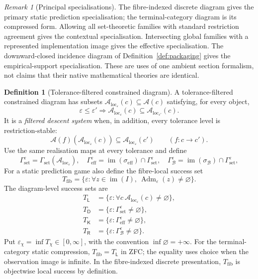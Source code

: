 \documentclass[11pt]{article}
\theoremstyle{plain}
\theoremstyle{definition}
\newtheorem{definition}[theorem]{Definition}
\theoremstyle{remark}
\newtheorem{remark}[theorem]{Remark}
\newcommand{\im}{\operatorname{im}}
\newcommand{\Adm}{\operatorname{Adm}}
\newcommand{\LocalAdm}{\mathcal{A}_{\mathrm{loc}}}
\newcommand{\eps}{\varepsilon}
\begin{document}
\begin{remark}[Principal specialisations]
The fibre-indexed discrete diagram gives the primary static prediction
specialisation; the terminal-category diagram is its compressed form. Allowing all
set-theoretic families with standard restriction agreement gives the contextual
specialisation. Intersecting global families with a represented implementation
image gives the effective specialisation. The downward-closed incidence diagram
of Definition~\ref{def:packaging} gives the empirical-support specialisation.
These are uses of one ambient section formalism, not claims that their native
mathematical theories are identical.
\end{remark}

\begin{definition}[Tolerance-filtered constrained diagram]\label{def:epsEC}
A tolerance-filtered constrained diagram has subsets
$\LocalAdm_\eps(c)\subseteq\mathcal A(c)$ satisfying, for every object,
\[
\eps\le\eps'
\Longrightarrow
\LocalAdm_\eps(c)\subseteq\LocalAdm_{\eps'}(c).
\]
It is a \emph{filtered descent system} when, in addition, every tolerance level
is restriction-stable:
\[
\mathcal A(f)(\LocalAdm_\eps(c))
\subseteq\LocalAdm_\eps(c')
\qquad(f:c\to c').
\]
Use the same realisation maps at every tolerance and define
\[
\Gamma_{\mathrm{set}}^\eps
=\Gamma_{\mathrm{set}}(\LocalAdm_\eps),\quad
\Gamma_{\mathrm{eff}}^\eps
=\im(\sigma_{\mathrm{eff}})\cap\Gamma_{\mathrm{set}}^\eps,
\quad
\Gamma_{\mathcal B}^\eps
=\im(\sigma_{\mathcal B})\cap\Gamma_{\mathrm{set}}^\eps,
\]
For a static prediction game also define the fibre-local success set
\[
T_{\mathrm{fib}}
=\{\eps:\forall z\in\im(I),\ \Adm_\eps(z)\ne\varnothing\}.
\]
The diagram-level success sets are
\begin{align*}
T_{\mathsf L}&=\{\eps:\forall c\ \LocalAdm_\eps(c)\ne\varnothing\},\\
T_{\mathsf D}&=\{\eps:\Gamma_{\mathrm{set}}^\eps\ne\varnothing\},\\
T_{\mathsf K}&=\{\eps:\Gamma_{\mathrm{eff}}^\eps\ne\varnothing\},\\
T_{\mathsf R}&=\{\eps:\Gamma_{\mathcal B}^\eps\ne\varnothing\}.
\end{align*}
Put $\eps_\chi=\inf T_\chi\in[0,\infty]$, with the convention
$\inf\varnothing=+\infty$.
For the terminal-category static compression, $T_{\mathrm{fib}}=T_{\mathsf L}$ in ZFC;
the equality uses choice when the observation image is infinite. In the
fibre-indexed discrete presentation, $T_{\mathrm{fib}}$ is objectwise local
success by definition.
\end{definition}
\end{document}
